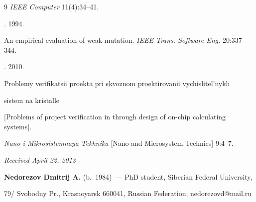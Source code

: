{{\begin{thebibliography}{9}
\textit{IEEE Computer} 11(4):34--41.







.  1994.


An empirical evaluation of weak mutation. \textit{IEEE Trans. Software Eng.} 20:337--344.







. 2010.


Problemy verifikatsii proekta pri skvoznom proektirovanii vychislitel'nykh


sistem na kristalle


[Problems of project verification in through design of on-chip calculating systems].


\textit{Nano i Mikrosistemnaya Tekhnika} [Nano and Microsystem Technics] 9:4--7.





 \end{thebibliography}


} }





\vspace*{-6pt}





\hfill{\small\textit{Received April 22, 2013}}





\vspace*{-6pt}





\Contr





\noindent


\textbf{Nedorezov Dmitrij A.} (b.\ 1984)~--- PhD student, Siberian Federal University,


79\!/ Svobodny Pr.,  Krasnoyarsk 660041, Russian Federation; nedorezovd@mail.ru





\vspace*{3pt}





